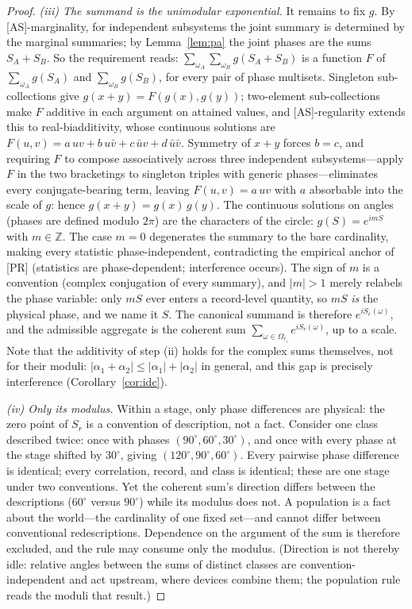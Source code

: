 \documentclass[11pt]{article}
\theoremstyle{definition}
\theoremstyle{remark}
\begin{document}
\begin{proof}
\emph{(iii) The summand is the unimodular exponential.} It remains to fix $g$. By [AS]-marginality, for independent subsystems the joint summary is determined by the marginal summaries; by Lemma~\ref{lem:pa} the joint phases are the sums $S_A + S_B$. So the requirement reads: $\sum_{\omega_A}\sum_{\omega_B} g(S_A + S_B)$ is a function $F$ of $\sum_{\omega_A} g(S_A)$ and $\sum_{\omega_B} g(S_B)$, for every pair of phase multisets. Singleton sub-collections give $g(x+y) = F(g(x), g(y))$; two-element sub-collections make $F$ additive in each argument on attained values, and [AS]-regularity extends this to real-biadditivity, whose continuous solutions are $F(u,v) = a\,uv + b\,u\bar v + c\,\bar u v + d\,\bar u \bar v$. Symmetry of $x + y$ forces $b = c$, and requiring $F$ to compose associatively across three independent subsystems---apply $F$ in the two bracketings to singleton triples with generic phases---eliminates every conjugate-bearing term, leaving $F(u,v) = a\,uv$ with $a$ absorbable into the scale of $g$: hence $g(x+y) = g(x)\,g(y)$. The continuous solutions on angles (phases are defined modulo $2\pi$) are the characters of the circle: $g(S) = e^{imS}$ with $m \in \mathbb{Z}$. The case $m = 0$ degenerates the summary to the bare cardinality, making every statistic phase-independent, contradicting the empirical anchor of [PR] (statistics are phase-dependent; interference occurs). The sign of $m$ is a convention (complex conjugation of every summary), and $|m| > 1$ merely relabels the phase variable: only $mS$ ever enters a record-level quantity, so $mS$ \emph{is} the physical phase, and we name it $S$. The canonical summand is therefore $e^{iS_r(\omega)}$, and the admissible aggregate is the coherent sum $\sum_{\omega \in \Omega_{r_i}} e^{iS_r(\omega)}$, up to a scale. Note that the additivity of step (ii) holds for the complex sums themselves, not for their moduli: $|\alpha_1 + \alpha_2| \le |\alpha_1| + |\alpha_2|$ in general, and this gap is precisely interference (Corollary~\ref{cor:idc}).

\emph{(iv) Only its modulus.} Within a stage, only phase differences are physical: the zero point of $S_r$ is a convention of description, not a fact. Consider one class described twice: once with phases $(90^\circ, 60^\circ, 30^\circ)$, and once with every phase at the stage shifted by $30^\circ$, giving $(120^\circ, 90^\circ, 60^\circ)$. Every pairwise phase difference is identical; every correlation, record, and class is identical; these are one stage under two conventions. Yet the coherent sum's direction differs between the descriptions ($60^\circ$ versus $90^\circ$) while its modulus does not. A population is a fact about the world---the cardinality of one fixed set---and cannot differ between conventional redescriptions. Dependence on the argument of the sum is therefore excluded, and the rule may consume only the modulus. (Direction is not thereby idle: relative angles between the sums of distinct classes are convention-independent and act upstream, where devices combine them; the population rule reads the moduli that result.)
\end{proof}
\end{document}
